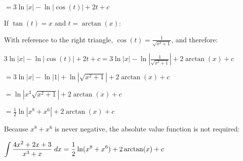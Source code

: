 \documentclass{article}
\begin{document}
 \begin{center}
  \( \displaystyle = 3\ln|x| - \ln|\cos(t)| + 2t + c\) 
 \end{center}
If $\tan(t) = x$ and $t = \arctan(x):$
\begin{center}
\end{center}
With reference to the right triangle, $\cos(t) = \frac{1}{\sqrt{x^2+1}}$, and therefore:
\begin{center}
  \( \displaystyle 3\ln|x| - \ln|\cos(t)| + 2t + c = 3\ln|x| - \ln|\frac{1}{\sqrt{x^2+1}}| + 2\arctan(x) + c\) 
 \end{center}
 \begin{center}
  \( \displaystyle = 3\ln|x| - \ln|1| + \ln|\sqrt{x^2+1}| + 2\arctan(x) + c\) 
 \end{center}
 \begin{center}
  \( \displaystyle = \ln|x^3\sqrt{x^2+1}| + 2\arctan(x) + c\) 
 \end{center}
 \begin{center}
  \( \displaystyle = \frac{1}{2}\ln|x^8+x^6| + 2\arctan(x) + c\) 
 \end{center}
 Because $x^8 + x^6$ is never negative, the absolute value function is not required:
 \begin{center}
  \( \displaystyle \int \frac{4x^2 + 2x + 3}{x^3 + x} \hspace{0.1cm} dx = \frac{1}{2}\ln({x^8+x^6}) + 2\arctan(x) + c\) 
 \end{center}
\end{document}
